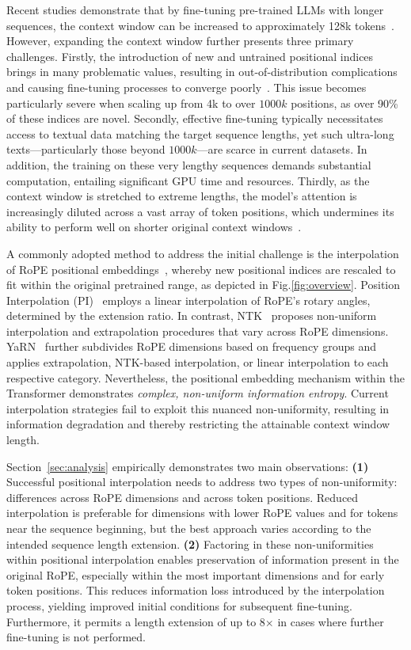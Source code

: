 Recent studies demonstrate that by fine-tuning pre-trained LLMs with longer sequences, the context window can be increased to approximately 128k tokens~\cite{longlora,pi,yarn,zhang2024soaring,liu2023scaling}. However, expanding the context window further presents three primary challenges. Firstly, the introduction of new and untrained positional indices brings in many problematic values, resulting in out-of-distribution complications and causing fine-tuning processes to converge poorly~\cite{pi}. This issue becomes particularly severe when scaling up from 4k to over $1000k$ positions, as over 90\% of these indices are novel. Secondly, effective fine-tuning typically necessitates access to textual data matching the target sequence lengths, yet such ultra-long texts—particularly those beyond $1000k$—are scarce in current datasets. In addition, the training on these very lengthy sequences demands substantial computation, entailing significant GPU time and resources. Thirdly, as the context window is stretched to extreme lengths, the model's attention is increasingly diluted across a vast array of token positions, which undermines its ability to perform well on shorter original context windows~\cite{pi}.

A commonly adopted method to address the initial challenge is the interpolation of RoPE positional embeddings~\cite{rope,pi}, whereby new positional indices are rescaled to fit within the original pretrained range, as depicted in Fig.\ref{fig:overview}. Position Interpolation (PI)~\cite{pi} employs a linear interpolation of RoPE’s rotary angles, determined by the extension ratio. In contrast, NTK~\cite{ntk,dynamicntk} proposes non-uniform interpolation and extrapolation procedures that vary across RoPE dimensions. YaRN~\cite{yarn} further subdivides RoPE dimensions based on frequency groups and applies extrapolation, NTK-based interpolation, or linear interpolation to each respective category. Nevertheless, the positional embedding mechanism within the Transformer demonstrates \emph{complex, non-uniform information entropy}. Current interpolation strategies fail to exploit this nuanced non-uniformity, resulting in information degradation and thereby restricting the attainable context window length.

Section~\ref{sec:analysis} empirically demonstrates two main observations: \textbf{(1)} Successful positional interpolation needs to address two types of non-uniformity: differences across RoPE dimensions and across token positions. Reduced interpolation is preferable for dimensions with lower RoPE values and for tokens near the sequence beginning, but the best approach varies according to the intended sequence length extension. 
\textbf{(2)} Factoring in these non-uniformities within positional interpolation enables preservation of information present in the original RoPE, especially within the most important dimensions and for early token positions. This reduces information loss introduced by the interpolation process, yielding improved initial conditions for subsequent fine-tuning. Furthermore, it permits a length extension of up to 8$\times$ in cases where further fine-tuning is not performed.

